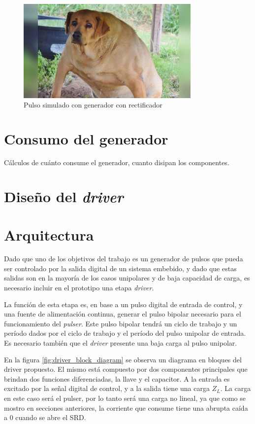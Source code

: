 \begin{figure}[tbp]
    \centering
    \includegraphics[width=0.8\textwidth]{images/placeholder.jpg}
    \caption{Pulso simulado con generador con rectificador}
    \label{fig:schottky_generator_result_pulse}
\end{figure}

\section{Consumo del generador}

Cálculos de cuánto consume el generador, cuanto disipan los componentes.

\section{Diseño del \textit{driver}}

\section{Arquitectura}

Dado que uno de los objetivos del trabajo es un generador de pulsos que pueda
ser controlado por la salida digital de un sistema embebido, y dado que estas
salidas son en la mayoría de los casos unipolares y de baja capacidad de carga,
es necesario incluir en el prototipo una etapa \textit{driver}.

La función de esta etapa es, en base a un pulso digital de entrada de control, y
una fuente de alimentación continua, generar el pulso bipolar necesario para el
funcionamiento del \textit{pulser}. Este pulso bipolar tendrá un ciclo de
trabajo y un período dados por el ciclo de trabajo y el período del pulso
unipolar de entrada. Es necesario también que el \textit{driver} presente una
baja carga al pulso unipolar.

En la figura \ref{fig:driver_block_diagram} se observa un diagrama en bloques
del driver propuesto. El mismo está compuesto por dos componentes principales
que brindan dos funciones diferenciadas, la llave y el capacitor. A la entrada
es excitado por la señal digital de control, y a la salida tiene una carga
$Z_L$. La carga en este caso será el pulser, por lo tanto será una carga no
lineal, ya que como se mostro en secciones anteriores, la corriente que consume
tiene una abrupta caída a 0 cuando se abre el SRD.

